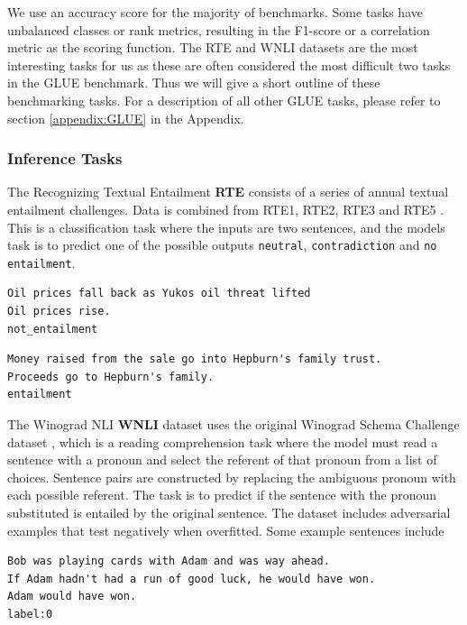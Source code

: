 \documentclass[a4paper,12pt,oneside,openright]{report}
\begin{document}
We use an accuracy score for the majority of benchmarks. 
Some tasks have unbalanced classes or rank metrics, resulting in the F1-score or a correlation metric as the scoring function. 
The RTE and WNLI datasets are the most interesting tasks for us as these are often considered the most difficult two tasks in the GLUE benchmark. 
Thus we will give a short outline of these benchmarking tasks. 
For a description of all other GLUE tasks, please refer to section \ref{appendix:GLUE} in the Appendix.

\subsubsection{Inference Tasks}


The Recognizing Textual Entailment \textbf{RTE} consists of a series of annual textual entailment challenges. 
Data is combined from RTE1, RTE2, RTE3 and RTE5 \cite{dagan2005} \cite{bar2006} \cite{bentivogli2009} \cite{giampiccolo2007}. 
This is a classification task where the inputs are two sentences, and the models task is to predict one of the possible outputs \texttt{neutral}, \texttt{contradiction} and \texttt{no entailment}.

\begin{tcolorbox}
\begin{verbatim}
Oil prices fall back as Yukos oil threat lifted	
Oil prices rise.
not_entailment
\end{verbatim}
\end{tcolorbox}

\begin{tcolorbox}
\begin{verbatim}
Money raised from the sale go into Hepburn's family trust.
Proceeds go to Hepburn's family.	
entailment
\end{verbatim}
\end{tcolorbox}

The Winograd NLI \textbf{WNLI} dataset uses the original Winograd Schema Challenge dataset \cite{levesque2012}, which is a reading comprehension task where the model must read a sentence with a pronoun and select the referent of that pronoun from a list of choices. 
Sentence pairs are constructed by replacing the ambiguous pronoun with each possible referent.
The task is to predict if the sentence with the pronoun substituted is entailed by the original sentence.
The dataset includes adversarial examples that test negatively when overfitted.
Some example sentences include 

\begin{tcolorbox}
\begin{verbatim}
Bob was playing cards with Adam and was way ahead.
If Adam hadn't had a run of good luck, he would have won.	
Adam would have won.
label:0
\end{verbatim}
\end{tcolorbox}
\end{document}
